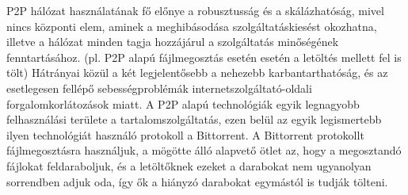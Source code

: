 P2P hálózat használatának fő előnye a robusztusság és a skálázhatóság, mivel nincs központi elem,
aminek a meghibásodása szolgáltatáskiesést okozhatna, illetve a hálózat minden tagja hozzájárul a
szolgáltatás minőségének fenntartásához. (pl. P2P alapú fájlmegosztás esetén esetén a letöltés
mellett fel is tölt) Hátrányai közül a két legjelentősebb a nehezebb karbantarthatóság, és az
esetlegesen fellépő sebességproblémák internetszolgáltató-oldali forgalomkorlátozások miatt.
A P2P alapú technológiák egyik legnagyobb felhasználási területe a tartalomszolgáltatás, ezen belül
az egyik legismertebb ilyen technológiát használó protokoll a Bittorrent. A Bittorrent protokollt
fájlmegosztásra használjuk, a mögötte álló alapvető ötlet az, hogy a megosztandó fájlokat
feldaraboljuk, és a letöltőknek ezeket a darabokat nem ugyanolyan sorrendben adjuk oda, így ők a
hiányzó darabokat egymástól is tudják tölteni. 
